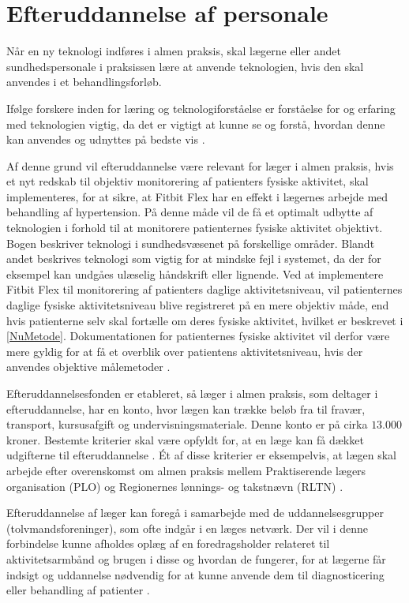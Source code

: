  \section{Efteruddannelse af personale}
\label{sec:efteruddannelse}
Når en ny teknologi indføres i almen praksis, skal lægerne eller andet sundhedspersonale i praksissen lære at anvende teknologien, hvis den skal anvendes i et behandlingsforløb. 

Ifølge forskere inden for læring og teknologiforståelse er forståelse for og erfaring med teknologien vigtig, da det er vigtigt at kunne se og forstå, hvordan denne kan anvendes og udnyttes på bedste vis \citep{aarhusuniversitet2013}. 

Af denne grund vil efteruddannelse være relevant for læger i almen praksis, hvis et nyt redskab til objektiv monitorering af patienters fysiske aktivitet, skal implementeres, for at sikre, at Fitbit Flex har en effekt i lægernes arbejde med behandling af hypertension. På denne måde vil de få et optimalt udbytte af teknologien i forhold til at monitorere patienternes fysiske aktivitet objektivt. Bogen  beskriver teknologi i sundhedsvæsenet på forskellige områder. Blandt andet beskrives teknologi som vigtig for at mindske fejl i systemet, da der for eksempel kan undgåes ulæselig håndskrift eller lignende. Ved at implementere Fitbit Flex til monitorering af patienters daglige aktivitetsniveau, vil patienternes daglige fysiske aktivitetsniveau blive registreret på en mere objektiv måde, end hvis patienterne selv skal fortælle om deres fysiske aktivitet, hvilket er beskrevet i \autoref{NuMetode}. Dokumentationen for patienternes fysiske aktivitet vil derfor være mere gyldig for at få et overblik over patientens aktivitetsniveau, hvis der anvendes objektive målemetoder \citep{hasse2012}. 

Efteruddannelsesfonden er etableret, så læger i almen praksis, som deltager i efteruddannelse, har en konto, hvor lægen kan trække beløb fra til fravær, transport, kursusafgift og undervisningsmateriale. Denne konto er på cirka $13.000$ kroner. Bestemte kriterier skal være opfyldt for, at en læge kan få dækket udgifterne til efteruddannelse \citep{vedsted2005}. Ét af disse kriterier er eksempelvis, at lægen skal arbejde efter overenskomst om almen praksis mellem Praktiserende lægers organisation (PLO) og Regionernes lønnings- og takstnævn (RLTN) \citep{fondenforalmenpraksis2016}. 

Efteruddannelse af læger kan foregå i samarbejde med de uddannelsesgrupper (tolvmandsforeninger), som ofte indgår i en læges netværk. Der vil i denne forbindelse kunne afholdes oplæg af en foredragsholder relateret til aktivitetsarmbånd og brugen i disse og hvordan de fungerer, for at lægerne får indsigt og uddannelse nødvendig for at kunne anvende dem til diagnosticering eller behandling af patienter \citep{vedsted2005}. 

